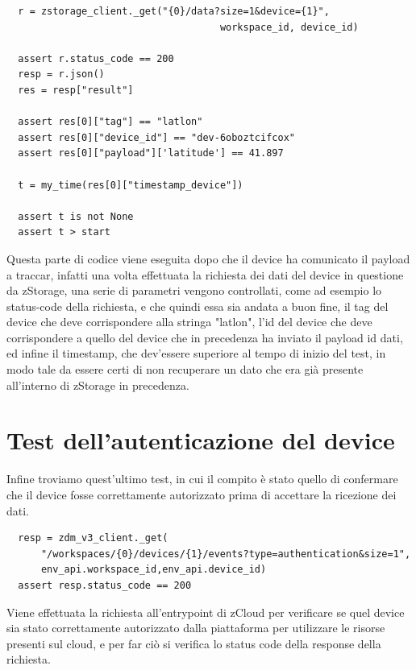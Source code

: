 \documentclass[a4paper,titlepage,12pt]{book}
\begin{document}
{\begin{verbatim}
  r = zstorage_client._get("{0}/data?size=1&device={1}",
                                     workspace_id, device_id)  
   
  assert r.status_code == 200
  resp = r.json()       
  res = resp["result"]

  assert res[0]["tag"] == "latlon"
  assert res[0]["device_id"] == "dev-6oboztcifcox"
  assert res[0]["payload"]['latitude'] == 41.897

  t = my_time(res[0]["timestamp_device"])
  
  assert t is not None
  assert t > start 
\end{verbatim}


\noindent Questa parte di codice viene eseguita dopo che il device ha comunicato il payload a traccar, infatti una volta effettuata la richiesta dei dati del device in questione da zStorage, una serie di parametri vengono controllati, come ad esempio lo status-code della richiesta, e che quindi essa sia andata a buon fine, il tag del device che deve corrispondere alla stringa "latlon", l'id del device che deve corrispondere a quello del device che in precedenza ha inviato il payload id dati, ed infine il timestamp, che dev'essere superiore al tempo di inizio del test, in modo tale da essere certi di non recuperare un dato che era già presente all'interno di zStorage in precedenza.

\section{
Test dell'autenticazione del device}
Infine troviamo quest'ultimo test, in cui il compito è stato quello di confermare che il device fosse correttamente autorizzato prima di accettare la ricezione dei dati.

\begin{verbatim}
  resp = zdm_v3_client._get(
      "/workspaces/{0}/devices/{1}/events?type=authentication&size=1",           
      env_api.workspace_id,env_api.device_id)
  assert resp.status_code == 200
\end{verbatim}


\noindent Viene effettuata la richiesta all'entrypoint di zCloud per verificare se quel device sia stato correttamente autorizzato dalla piattaforma per utilizzare le risorse presenti sul cloud, e per far ciò si verifica lo status code della response della richiesta.

}
\end{document}
